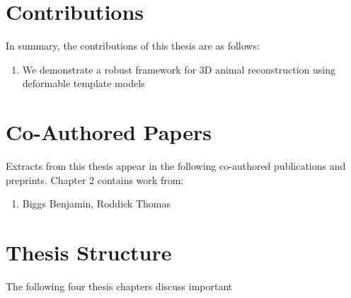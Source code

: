\section{Contributions}  %
In summary, the contributions of this thesis are as follows:
\begin{enumerate}
    \item We demonstrate a robust framework for 3D animal reconstruction using deformable template models
\end{enumerate}

\section{Co-Authored Papers}  %

Extracts from this thesis appear in the following co-authored publications and preprints. Chapter 2 contains work from:

\begin{enumerate}
    \item Biggs Benjamin, Roddick Thomas
\end{enumerate}

\section{Thesis Structure}  %

The following four thesis chapters discuss important 
